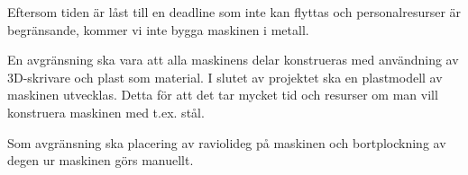 Eftersom tiden är låst till en deadline som inte kan flyttas och personalresurser är begränsande, kommer vi inte bygga maskinen i metall.

En avgränsning ska vara att alla maskinens delar konstrueras med användning av 3D-skrivare och plast som material. I slutet av projektet ska en plastmodell av maskinen utvecklas. Detta för att det tar mycket tid och resurser om man vill konstruera maskinen med t.ex. stål.

Som avgränsning ska placering av raviolideg på maskinen och bortplockning av degen ur maskinen görs manuellt.